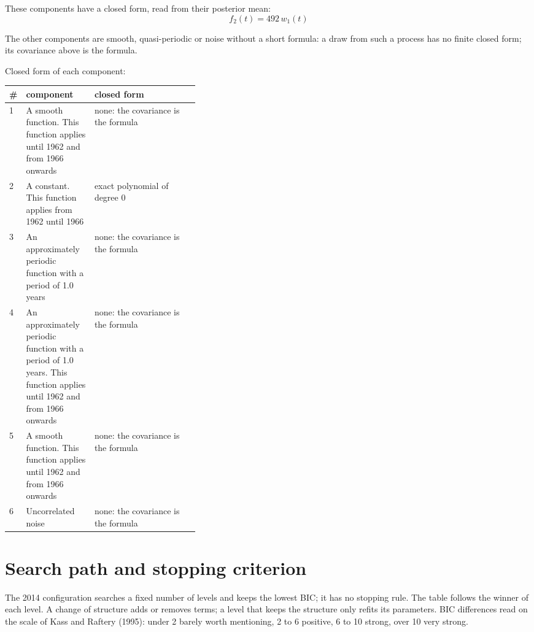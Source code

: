 \documentclass[11pt,a4paper]{article}
\begin{document}
These components have a closed form, read from their posterior mean:
\begin{dmath*}
f_{2}(t) = 492\,w_{1}(t)
\end{dmath*}

The other components are smooth, quasi-periodic or noise without a short formula: a draw from such a process has no finite closed form; its covariance above is the formula.

Closed form of each component:

\begin{center}\footnotesize
\begin{tabular}{lp{0.36\linewidth}l}
\toprule
\# & component & closed form \\
\midrule
1 & A smooth function. This function applies until 1962 and from 1966 onwards & none: the covariance is the formula \\
2 & A constant. This function applies from 1962 until 1966 & exact polynomial of degree 0 \\
3 & An approximately periodic function with a period of 1.0 years & none: the covariance is the formula \\
4 & An approximately periodic function with a period of 1.0 years. This function applies until 1962 and from 1966 onwards & none: the covariance is the formula \\
5 & A smooth function. This function applies until 1962 and from 1966 onwards & none: the covariance is the formula \\
6 & Uncorrelated noise & none: the covariance is the formula \\
\bottomrule
\end{tabular}
\end{center}

\section*{Search path and stopping criterion}

The 2014 configuration searches a fixed number of levels and keeps the lowest BIC; it has no stopping rule. The table follows the winner of each level. A change of structure adds or removes terms; a level that keeps the structure only refits its parameters. BIC differences read on the scale of Kass and Raftery (1995): under 2 barely worth mentioning, 2 to 6 positive, 6 to 10 strong, over 10 very strong.
\end{document}
